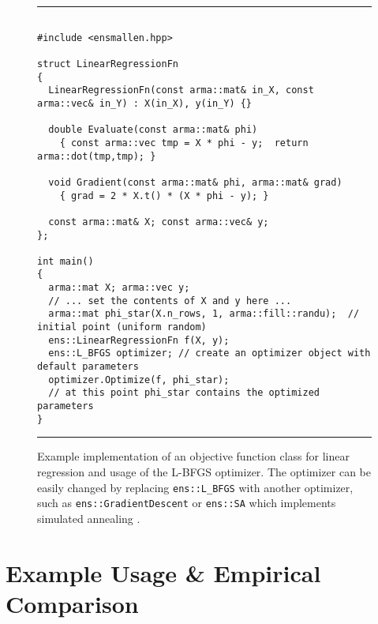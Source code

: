 \documentclass[twoside,11pt]{article}
\begin{document}
\begin{figure}[b!]
\hrule
\vspace{1ex}
\centering
\begin{verbatim}

#include <ensmallen.hpp>

struct LinearRegressionFn
{
  LinearRegressionFn(const arma::mat& in_X, const arma::vec& in_Y) : X(in_X), y(in_Y) {}

  double Evaluate(const arma::mat& phi)
    { const arma::vec tmp = X * phi - y;  return arma::dot(tmp,tmp); }
  
  void Gradient(const arma::mat& phi, arma::mat& grad)
    { grad = 2 * X.t() * (X * phi - y); }

  const arma::mat& X; const arma::vec& y;
};

int main() 
{
  arma::mat X; arma::vec y;
  // ... set the contents of X and y here ...
  arma::mat phi_star(X.n_rows, 1, arma::fill::randu);  // initial point (uniform random)
  ens::LinearRegressionFn f(X, y);
  ens::L_BFGS optimizer; // create an optimizer object with default parameters
  optimizer.Optimize(f, phi_star);
  // at this point phi_star contains the optimized parameters
}
\end{verbatim}
\hrule
\vspace*{-0.5em}
\caption{Example implementation of an objective function class for linear
regression and usage of the L-BFGS optimizer.
The optimizer can be easily changed by replacing
{\tt ens::L\_BFGS} with another optimizer,
such as {\tt ens::GradientDescent}
or {\tt ens::SA} which implements simulated annealing \citep{kirkpatrick1983optimization}.
}
\label{fig:lr_function}
\vspace*{-2em}
\end{figure}


\section{Example Usage \& Empirical Comparison}
\end{document}
